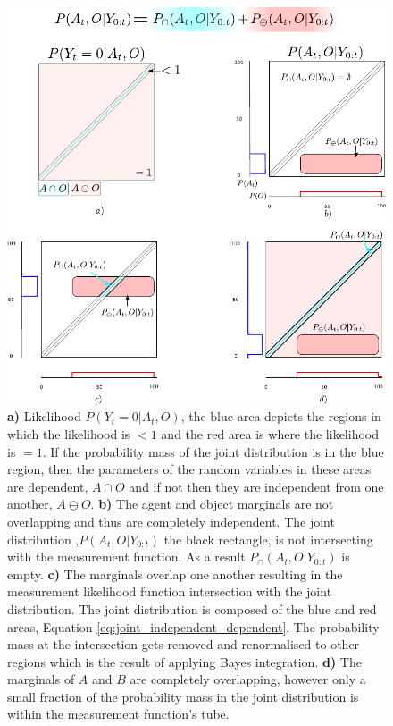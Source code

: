  \begin{figure}
 \centering
  \includegraphics[width=\textwidth]{./ch5-MLMF/Figures/Figure7.pdf}
  \caption{
  \textbf{a)} Likelihood $P(Y_t=0|A_t,O)$, the blue area depicts the regions in which the likelihood is $<1$ 
  and the red area is where the likelihood is $=1$. If the probability mass of the joint distribution 
  is in the blue region, then the parameters of the random variables in these areas are dependent, $A \cap O$
  and if not then they are independent from one another, $A \ominus O$.  
   \textbf{b)} The agent and object marginals are not overlapping and thus are completely independent. The joint distribution 
   ,$P(A_t,O|Y_{0:t})$ the black rectangle,  is not intersecting with the measurement function. As a result $P_{\cap}(A_t,O|Y_{0:t})$
   is empty.
 \textbf{c)} The marginals overlap one another resulting in the measurement likelihood function intersection with the joint distribution.
 The joint distribution is composed of the blue and red areas, Equation \ref{eq:joint_independent_dependent}.
 The probability mass at the intersection gets removed and renormalised to other regions which is the result of applying Bayes integration. 
 \textbf{d)} The marginals of $A$ and $B$ are completely overlapping, however only a small fraction of the probability mass 
 in the joint distribution is within the measurement function's tube.}
  \label{fig:overlap_dependence_independence}
\end{figure}

